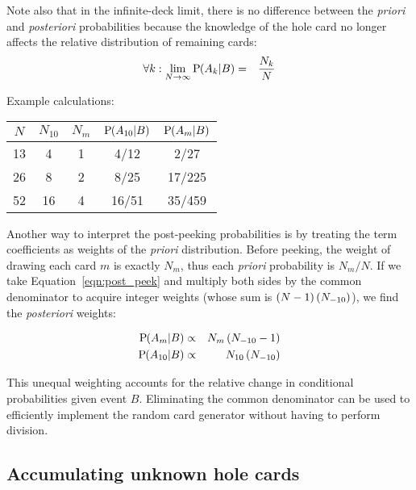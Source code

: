 Note also that in the infinite-deck limit, there is no difference
between the \emph{priori} and \emph{posteriori} probabilities because
the knowledge of the hole card no longer affects the relative distribution of 
remaining cards:
\begin{eqnarray}
\forall k: \lim_{N\rightarrow\infty}{\textrm{P}\hspace{-.5ex}\left(A_k|B\right)} &=& \frac{N_k}{N}
\end{eqnarray}

\noindent
Example calculations:
\begin{center}
\begin{tabular}{|c|c|c||c|c|}
\hline
$N$ & $N_{10}$ & $N_m$ & $\textrm{P}\hspace{-.5ex}\left(A_{10}|B\right)$ & $\textrm{P}\hspace{-.5ex}\left(A_m|B\right)$ \\ \hline \hline
13 & 4 & 1 & 4/12 & 2/27 \\ \hline
26 & 8 & 2 & 8/25 & 17/225 \\ \hline
52 & 16 & 4 & 16/51 & 35/459 \\ \hline
\end{tabular}
\end{center}

Another way to interpret the post-peeking probabilities is by treating 
the term coefficients as weights of the \emph{priori} distribution.
Before peeking, the weight of drawing each card $m$ is exactly
$N_m$, thus each \emph{priori} probability is $N_m/N$.
If we take Equation~\ref{eqn:post_peek} and multiply both sides
by the common denominator to acquire integer weights (whose sum is 
$\left(N-1\right)\left(N_{-10}\right)$), we find the \emph{posteriori} weights:

\begin{eqnarray}
\textrm{P}\hspace{-.5ex}\left(A_m|B\right) &\propto& N_m \left(N_{-10}-1\right) \\
\textrm{P}\hspace{-.5ex}\left(A_{10}|B\right) &\propto& N_{10} \left(N_{-10}\right)
\end{eqnarray}

This unequal weighting accounts for the relative change in 
conditional probabilities given event $B$.
Eliminating the common denominator can be used to efficiently implement the
random card generator without having to perform division.

\subsection{Accumulating unknown hole cards}
\label{sec:basic:peeking:accumulate}

